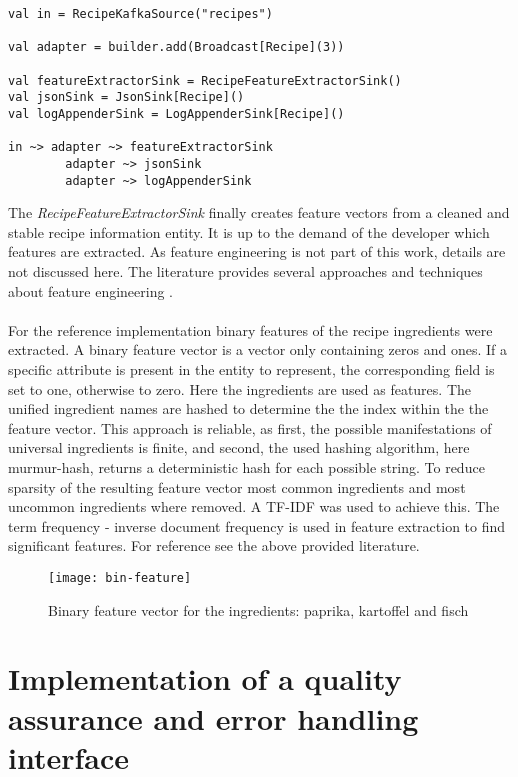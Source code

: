 \begin{lstlisting}[style=myScalastyle,label={lst:output},caption={Example of akka streams graph DSL for splitting streams}]
val in = RecipeKafkaSource("recipes")

val adapter = builder.add(Broadcast[Recipe](3))

val featureExtractorSink = RecipeFeatureExtractorSink()
val jsonSink = JsonSink[Recipe]()
val logAppenderSink = LogAppenderSink[Recipe]()

in ~> adapter ~> featureExtractorSink
        adapter ~> jsonSink
        adapter ~> logAppenderSink
\end{lstlisting}

The \textit{RecipeFeatureExtractorSink} finally creates feature vectors from a cleaned and stable recipe information entity. It is up to the demand of the developer which features are extracted. As feature engineering is not part of this work, details are not discussed here. The literature provides several approaches and techniques about feature engineering\cite{mastering_feature_engineering_2017} \cite{liu_2001}. 
\\\\
For the reference implementation binary features of the recipe ingredients were extracted. A binary feature vector is a vector only containing zeros and ones. If a specific attribute is present in the entity to represent, the corresponding field is set to one, otherwise to zero. Here the ingredients are used as features. The unified ingredient names are hashed to determine the the index within the the feature vector. This approach is reliable, as first, the possible manifestations of universal ingredients is finite, and second, the used hashing algorithm, here murmur-hash, returns a deterministic hash for each possible string. To reduce sparsity of the resulting feature vector most common ingredients and most uncommon ingredients where removed. A TF-IDF was used to achieve this. The term frequency - inverse document frequency is used in feature extraction to find significant features. For reference see the above provided literature.

\begin{figure}[htb]
  \centering
  \texttt{[image: bin-feature]}\\
  \caption{Binary feature vector for the ingredients: paprika, kartoffel and fisch}
  \label{fig:bin-feature}
\end{figure}

\section{Implementation of a quality assurance and error handling interface}

